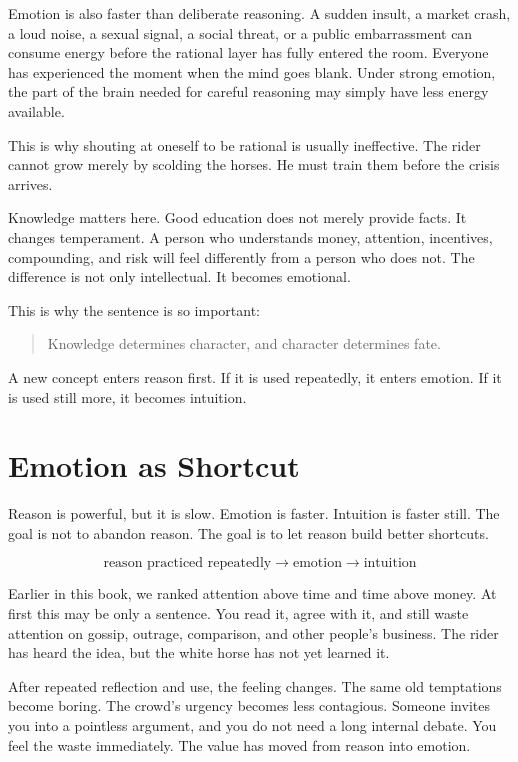 Emotion is also faster than deliberate reasoning. A sudden insult, a market crash, a loud noise, a sexual signal, a social threat, or a public embarrassment can consume energy before the rational layer has fully entered the room. Everyone has experienced the moment when the mind goes blank. Under strong emotion, the part of the brain needed for careful reasoning may simply have less energy available.

This is why shouting at oneself to be rational is usually ineffective. The rider cannot grow merely by scolding the horses. He must train them before the crisis arrives.

Knowledge matters here. Good education does not merely provide facts. It changes temperament. A person who understands money, attention, incentives, compounding, and risk will feel differently from a person who does not. The difference is not only intellectual. It becomes emotional.

This is why the sentence is so important:

\begin{quote}
Knowledge determines character, and character determines fate.
\end{quote}

A new concept enters reason first. If it is used repeatedly, it enters emotion. If it is used still more, it becomes intuition.

\section*{Emotion as Shortcut}

Reason is powerful, but it is slow. Emotion is faster. Intuition is faster still. The goal is not to abandon reason. The goal is to let reason build better shortcuts.

\[
\text{reason practiced repeatedly} \rightarrow \text{emotion} \rightarrow \text{intuition}
\]

Earlier in this book, we ranked attention above time and time above money. At first this may be only a sentence. You read it, agree with it, and still waste attention on gossip, outrage, comparison, and other people's business. The rider has heard the idea, but the white horse has not yet learned it.

After repeated reflection and use, the feeling changes. The same old temptations become boring. The crowd's urgency becomes less contagious. Someone invites you into a pointless argument, and you do not need a long internal debate. You feel the waste immediately. The value has moved from reason into emotion.

